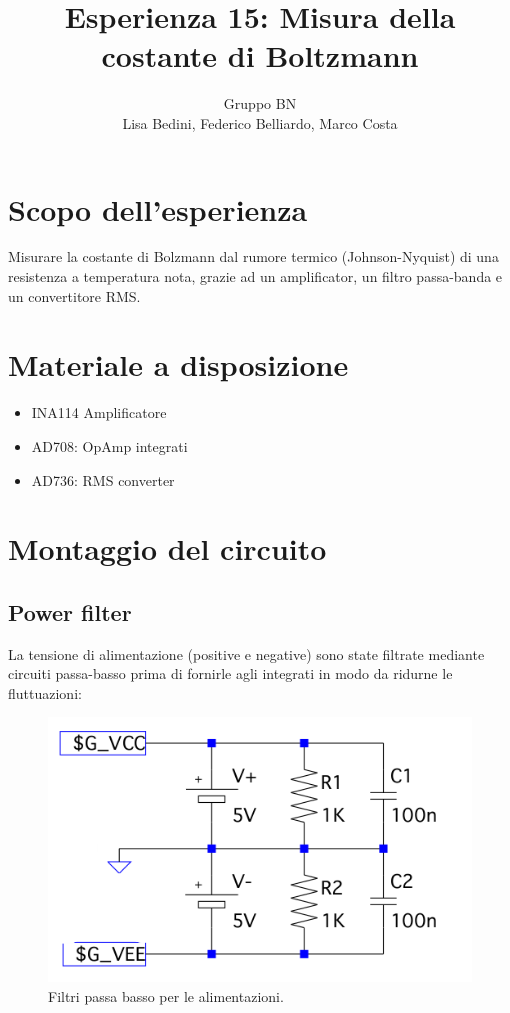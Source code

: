\documentclass[10pt,a4paper]{article}
\author{Gruppo BN \\Lisa Bedini,  Federico Belliardo, Marco Costa}
\title{Esperienza 15: Misura della costante di Boltzmann}
\begin{document}
\maketitle
\section{Scopo dell'esperienza}
Misurare la costante di Bolzmann dal rumore termico (Johnson-Nyquist) di una resistenza a temperatura nota, grazie ad un amplificator, un filtro passa-banda e un convertitore RMS.

\section{Materiale a disposizione}
\begin{itemize}
\item INA114 Amplificatore
\item AD708: OpAmp integrati
\item AD736: RMS converter
\end{itemize}

\section{Montaggio del circuito}
\subsection{Power filter}
La tensione di alimentazione (positive e negative) sono state filtrate mediante circuiti passa-basso prima di fornirle agli integrati in modo da ridurne le fluttuazioni:\\

\begin{figure}[!htb]
\centering
\includegraphics[scale=0.5]{powerfilter.png}
\caption{Filtri passa basso per le alimentazioni.\label{power}}
\end{figure}
\end{document}
